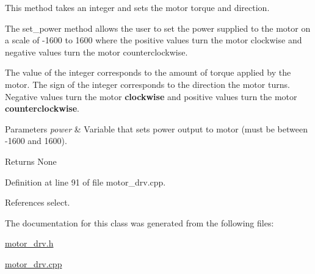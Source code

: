 This method takes an integer and sets the motor torque and direction. 

The set\-\_\-power method allows the user to set the power supplied to the motor on a scale of -\/1600 to 1600 where the positive values turn the motor clockwise and negative values turn the motor counterclockwise.

The value of the integer corresponds to the amount of torque applied by the motor. The sign of the integer corresponds to the direction the motor turns. Negative values turn the motor {\bfseries clockwise} and positive values turn the motor {\bfseries counterclockwise}. 
\begin{DoxyParams}{Parameters}
{\em power} & Variable that sets power output to motor (must be between -\/1600 and 1600). \\
\hline
\end{DoxyParams}
\begin{DoxyReturn}{Returns}
None 
\end{DoxyReturn}


Definition at line 91 of file motor\-\_\-drv.\-cpp.



References select.



The documentation for this class was generated from the following files\-:\begin{DoxyCompactItemize}
\item 
\hyperlink{motor__drv_8h}{motor\-\_\-drv.\-h}\item 
\hyperlink{motor__drv_8cpp}{motor\-\_\-drv.\-cpp}\end{DoxyCompactItemize}
